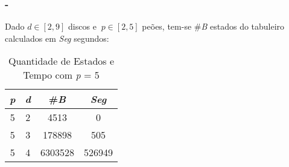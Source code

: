 \begin{frame}
\frametitle{\secname - \subsecname}
Dado $d\!\in\![2,9]$ discos e $\ p\!\in\![2,5]$ peões, tem-se \#\emph{B} estados do tabuleiro calculados em \emph{Seg} segundos:

\begin{table}[ht]
\centering
\begin{tabular}{|c|c|c|c|}
\hline
\emph{p} & \emph{d} & \#\emph{B} & \emph{Seg}\tabularnewline
\hline
\hline
5 & 2 & 4513 & 0\tabularnewline
\hline
5 & 3 & 178898 & 505\tabularnewline
\hline
5 & 4 & 6303528 & 526949\tabularnewline
\hline
\end{tabular}
\caption{Quantidade de Estados e Tempo com \emph{p} = 5}
\label{tab:quantidade-de-estados-e-tempo-com-p-5}
\end{table}
\end{frame}
